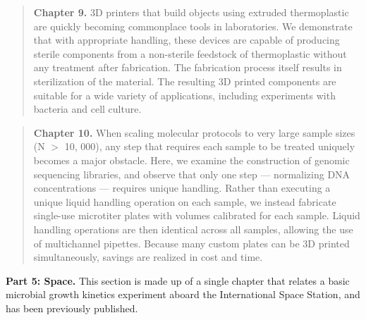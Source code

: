 \begin{quote} \noindent\textbf{Chapter 9.} 3D printers that build objects
using extruded thermoplastic are quickly becoming commonplace tools in
laboratories. We demonstrate that with appropriate handling, these devices are
capable of producing sterile components from a non-sterile feedstock of
thermoplastic without any treatment after fabrication. The fabrication process
itself results in sterilization of the material. The resulting 3D printed
components are suitable for a wide variety of applications, including
experiments with bacteria and cell culture. \end{quote}

\begin{quote} \noindent\textbf{Chapter 10.} When scaling molecular protocols
to very large sample sizes (N $>$ 10, 000), any step that requires each sample
to be treated uniquely becomes a major obstacle. Here, we examine the
construction of genomic sequencing libraries, and observe that only one step
--- normalizing DNA concentrations --- requires unique handling. Rather than
executing a unique liquid handling operation on each sample, we instead
fabricate single-use microtiter plates with volumes calibrated for each
sample. Liquid handling operations are then identical across all samples,
allowing the use of multichannel pipettes. Because many custom plates can be
3D printed simultaneously, savings are realized in cost and time. \end{quote}

\noindent\textbf{Part 5: Space.}
This section is made up of a single chapter that relates a basic microbial growth kinetics experiment aboard the International Space Station, and has been previously published. \cite{coil2016growth}

\printbibliography[heading=subbibliography]